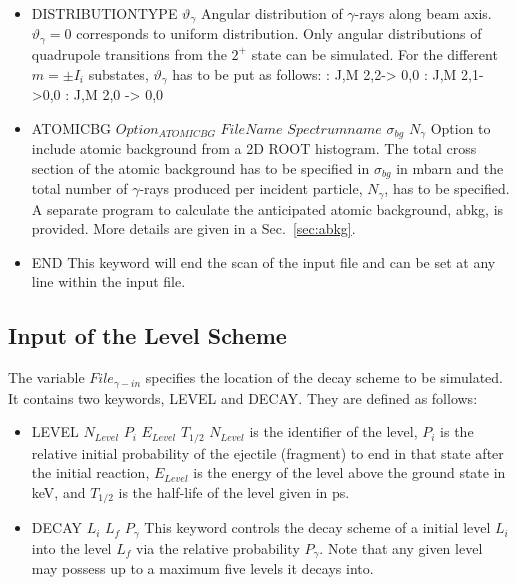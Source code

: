 \documentclass[12pt]{book}
\begin{document}
\begin{itemize}
\item DISTRIBUTIONTYPE $\vartheta_{\gamma}$\hfill{} \linebreak
  Angular distribution of $\gamma$-rays along beam axis. $\vartheta_{\gamma}=0$ corresponds to uniform distribution.
  Only angular distributions of quadrupole transitions from the $2^{+}$ state can be simulated. 
  For the different $m=\pm I_{i}$ substates, $\vartheta_{\gamma}$ has to be put as follows: 
  \linebreak
    \linebreak
  {: J,M 2,2-> 0,0      : J,M 2,1->0,0     : J,M 2,0 -> 0,0    \linebreak
    }
  \linebreak
    \linebreak

\item ATOMICBG $Option_{ATOMICBG}$ $FileName$ $Spectrumname$ $\sigma_{bg}$ $N_{\gamma}$\hfill{} \linebreak
  Option to include atomic background from a 2D ROOT histogram. The total cross section of the
  atomic background has to be specified in $\sigma_{bg}$ in mbarn and the total number of $\gamma$-rays produced
  per incident particle, $N_{\gamma}$, has to be specified. A separate program to calculate the
  anticipated atomic background, abkg, is provided. More details are given in a Sec.~\ref{sec:abkg}.
\item END\hfill{} \linebreak
  This keyword will end the scan of the input file and can be set at any line within the input file.
\end{itemize}

\subsection{Input of the Level Scheme}

The variable $File_{\gamma-in}$ specifies the location of the decay scheme to be simulated. It contains
two keywords, {\ttfamily LEVEL} and {\ttfamily DECAY}. They are defined as follows:

\begin{itemize}
\item LEVEL $N_{Level}$ $P_{i}$ $E_{Level}$ $T_{1/2}$\hfill{} \linebreak
 $N_{Level}$ is the identifier of the level, $P_{i}$ is the relative initial probability 
  of the ejectile (fragment) to end
  in that state after the initial reaction, $E_{Level}$ is the energy of the level 
  above the ground state in keV, and $T_{1/2}$ is the half-life of the level given in ps.
\item DECAY $L_{i}$ $L_{f}$ $P_{\gamma}$\hfill{} \linebreak
  This keyword controls the decay scheme of a initial level $L_{i}$ into the level $L_{f}$ via the relative probability
  $P_{\gamma}$. Note that any given level may possess up to a maximum five levels it decays into.
\end{itemize}
\end{document}
